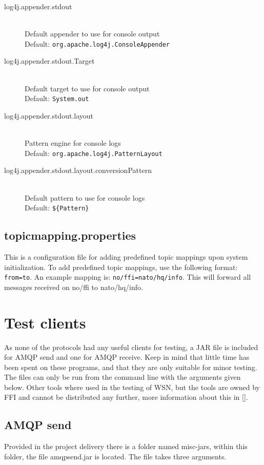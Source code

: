 \begin{description}
 \item[log4j.appender.stdout] \hfill \\
  Default appender to use for console output \hfill \\ Default: \verb!org.apache.log4j.ConsoleAppender!
   \item[log4j.appender.stdout.Target] \hfill \\
  Default target to use for console output \hfill \\ Default: \verb!System.out!
    \item[log4j.appender.stdout.layout] \hfill \\
  Pattern engine for console logs \hfill \\ Default: \verb!org.apache.log4j.PatternLayout!
   \item[log4j.appender.stdout.layout.conversionPattern] \hfill \\
  Default pattern to use for console logs \hfill \\ Default: \verb!${Pattern}!
  
 \end{description}
 
 \subsection{topicmapping.properties}
 \label{subsec:topicmapping.properties}
 
This is a configuration file for adding predefined topic mappings upon system initialization. To add predefined topic mappings, use the following format: \verb!from=to!. An example mapping is: \verb!no/ffi=nato/hq/info!.
This will forward all messages received on no/ffi to nato/hq/info.
 
\section{Test clients}
\label{sec:test_clients}
As none of the protocols had any useful clients for testing, a JAR file is included for AMQP send and one for AMQP receive. Keep in mind that little time has been spent on these programs, and that they are only suitable for minor testing. The files can only be run from the command line with the arguments given below. Other tools where used in the testing of WSN, but the tools are owned by FFI and cannot be distributed any further, more information about this in \ref{}.

\subsection{AMQP send}
\label{subsec:test_clients-amqp_send}
Provided in the project delivery there is a folder named misc-jars, within this folder, the file amqpsend.jar is located. The file takes three arguments.

